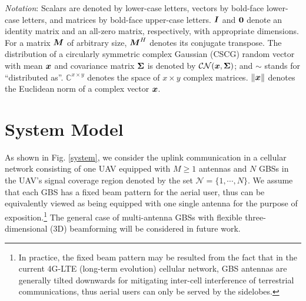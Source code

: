\documentclass[onecolumn, draftclsnofoot, 12pt]{IEEEtran}
\newcommand{\mv}[1]{\mbox{\boldmath{$ #1 $}}}
\begin{document}
{\it Notation}: Scalars are denoted by lower-case letters, vectors
by bold-face lower-case letters, and matrices by
bold-face upper-case letters. $\mv{I}$ and $\mv{0}$  denote an
identity matrix and an all-zero matrix, respectively, with
appropriate dimensions. For a matrix
$\mv{M}$ of arbitrary size, $\mv{M}^{H}$ denotes its
conjugate transpose. The
distribution of a circularly symmetric complex Gaussian (CSCG) random vector with mean $\mv{x}$ and
covariance matrix $\mv{\Sigma}$ is denoted by
$\mathcal{CN}(\mv{x},\mv{\Sigma})$; and $\sim$ stands for
``distributed as''. $\mathbb{C}^{x \times y}$ denotes the space of
$x\times y$ complex matrices. $\|\mv{x}\|$ denotes the Euclidean norm of a complex vector
$\mv{x}$.



\section{System Model}\label{sec:System Model}

As shown in Fig. \ref{system}, we consider the uplink communication in a cellular network consisting of one UAV equipped with $M\geq1$ antennas and $N$ GBSs in the UAV's signal coverage region denoted by the set $\mathcal{N}=\{1,\cdots,N\}$. We assume that each GBS has a fixed beam pattern for the aerial user, thus can be equivalently viewed as being equipped with one single antenna for the purpose of exposition.\footnote{In practice, the fixed beam pattern may be resulted from the fact that in the current 4G-LTE (long-term evolution) cellular network, GBS antennas are generally tilted downwards for mitigating inter-cell interference of terrestrial communications, thus aerial users can only be served by the sidelobes.} The general case of multi-antenna GBSs with flexible three-dimensional (3D) beamforming will be considered in future work.
\end{document}
